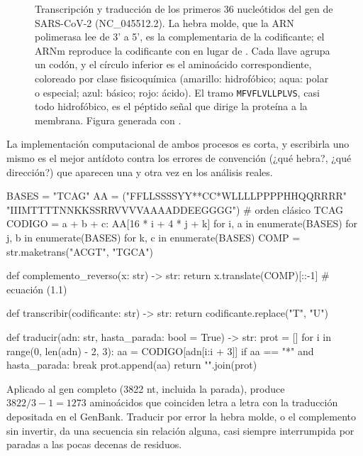 \begin{figure}[t]
\centering

\caption[Del gen a la proteína en un fragmento real]{Transcripción y traducción de los primeros 36 nucleótidos del gen  de SARS-CoV-2 (NC\_045512.2). La hebra molde, que la ARN polimerasa lee de 3' a 5', es la complementaria de la codificante; el ARNm reproduce la codificante con  en lugar de . Cada llave agrupa un codón, y el círculo inferior es el aminoácido correspondiente, coloreado por clase fisicoquímica (amarillo: hidrofóbico; aqua: polar o especial; azul: básico; rojo: ácido). El tramo \texttt{MFVFLVLLPLVS}, casi todo hidrofóbico, es el péptido señal que dirige la proteína a la membrana. Figura generada con .}
\label{fig:01-spike}
\end{figure}

La implementación computacional de ambos procesos es corta, y escribirla uno mismo es el mejor antídoto contra los errores de convención (¿qué hebra?, ¿qué dirección?) que aparecen una y otra vez en los análisis reales.

\begin{codigo}[dogma.py]
BASES = "TCAG"
AA = ("FFLLSSSSYY**CC*WLLLLPPPPHHQQRRRR"
      "IIIMTTTTNNKKSSRRVVVVAAAADDEEGGGG")      # orden clásico TCAG
CODIGO = {a + b + c: AA[16 * i + 4 * j + k]
          for i, a in enumerate(BASES) for j, b in enumerate(BASES)
          for k, c in enumerate(BASES)}
COMP = str.maketrans("ACGT", "TGCA")

def complemento_reverso(x: str) -> str:
    return x.translate(COMP)[::-1]            # ecuación (1.1)

def transcribir(codificante: str) -> str:
    return codificante.replace("T", "U")

def traducir(adn: str, hasta_parada: bool = True) -> str:
    prot = []
    for i in range(0, len(adn) - 2, 3):
        aa = CODIGO[adn[i:i + 3]]
        if aa == "*" and hasta_parada:
            break
        prot.append(aa)
    return "".join(prot)
\end{codigo}

Aplicado al gen  completo (\num{3822} nt, incluida la parada),  produce $3822/3-1=1273$ aminoácidos que coinciden letra a letra con la traducción depositada en el GenBank. Traducir por error la hebra molde, o el complemento sin invertir, da una secuencia sin relación alguna, casi siempre interrumpida por paradas a las pocas decenas de residuos.

